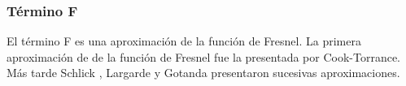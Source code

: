 
            


        \subsubsection*{T\'ermino F}
            El t\'ermino F es una aproximaci\'on de la funci\'on de Fresnel. La primera aproximaci\'on de de la funci\'on de Fresnel
            fue la presentada por Cook-Torrance. M\'as tarde Schlick \autocite{schlick}, Largarde \autocite{frostbite} y Gotanda \autocite{gotanda}
            presentaron sucesivas aproximaciones.

